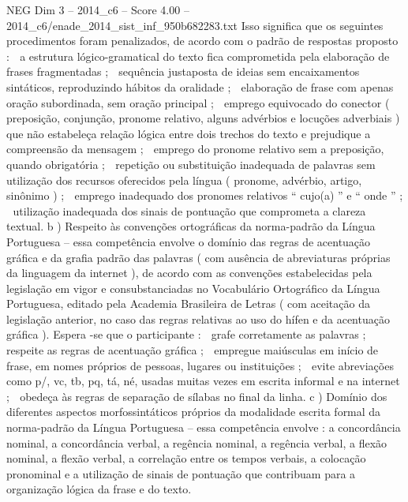 \begin{textsample}{NEG Dim 3 – 2014\_c6 – Score 4.00 – 2014\_c6/enade\_2014\_sist\_inf\_950b682283.txt}
Isso significa que os seguintes procedimentos foram penalizados, de acordo com o padrão de respostas proposto :  a estrutura lógico-gramatical do texto fica comprometida pela elaboração de frases fragmentadas ;  sequência justaposta de ideias sem encaixamentos sintáticos, reproduzindo hábitos da oralidade ;  elaboração de frase com apenas oração subordinada, sem oração principal ;  emprego equivocado do conector ( preposição, conjunção, pronome relativo, alguns advérbios e locuções adverbiais ) que não estabeleça relação lógica entre dois trechos do texto e prejudique a compreensão da mensagem ;  emprego do pronome relativo sem a preposição, quando obrigatória ;  repetição ou substituição inadequada de palavras sem utilização dos recursos oferecidos pela língua ( pronome, advérbio, artigo, sinônimo ) ;  emprego inadequado dos pronomes relativos “ cujo(a) ” e “ onde ” ;  utilização inadequada dos sinais de pontuação que comprometa a clareza textual. b ) Respeito às convenções ortográficas da norma-padrão da Língua Portuguesa – essa competência envolve o domínio das regras de acentuação gráfica e da grafia padrão das palavras ( com ausência de abreviaturas próprias da linguagem da internet ), de acordo com as convenções estabelecidas pela legislação em vigor e consubstanciadas no Vocabulário Ortográfico da Língua Portuguesa, editado pela Academia Brasileira de Letras ( com aceitação da legislação anterior, no caso das regras relativas ao uso do hífen e da acentuação gráfica ).
Espera -se que o participante :  grafe corretamente as palavras ;  respeite as regras de acentuação gráfica ;  empregue maiúsculas em início de frase, em nomes próprios de pessoas, lugares ou instituições ;  evite abreviações como p/, vc, tb, pq, tá, né, usadas muitas vezes em escrita informal e na internet ;  obedeça às regras de separação de sílabas no final da linha. c ) Domínio dos diferentes aspectos morfossintáticos próprios da modalidade escrita formal da norma-padrão da Língua Portuguesa – essa competência envolve : a concordância nominal, a concordância verbal, a regência nominal, a regência verbal, a flexão nominal, a flexão verbal, a correlação entre os tempos verbais, a colocação pronominal e a utilização de sinais de pontuação que contribuam para a organização lógica da frase e do texto.

\end{textsample}
